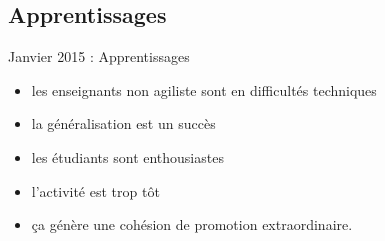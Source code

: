 \documentclass{beamer}
\begin{document}
\subsection{Apprentissages}
\begin{frame}{Janvier 2015 : Apprentissages}
  \begin{itemize}
    \item les enseignants non agiliste sont en difficultés techniques
    \item la généralisation est un succès
    \item les étudiants sont enthousiastes
    \item l'activité est trop tôt
    \item ça génère une cohésion de promotion extraordinaire.
  \end{itemize}
\end{frame}

\end{document}
